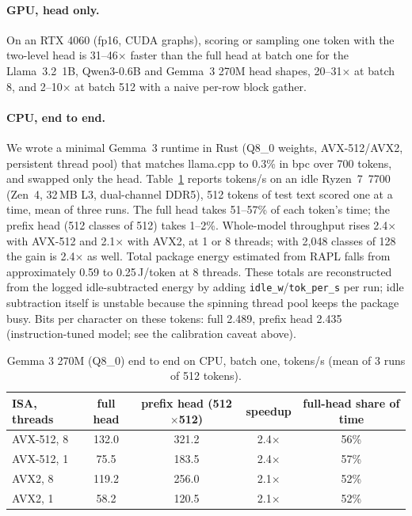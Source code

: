 \documentclass[11pt]{article}
\begin{document}
\paragraph{GPU, head only.} On an RTX 4060 (fp16, CUDA graphs), scoring or sampling one token with the two-level head is 31--46$\times$ faster than the full head at batch one for the Llama~3.2~1B, Qwen3-0.6B and Gemma~3 270M head shapes, 20--31$\times$ at batch 8, and 2--10$\times$ at batch 512 with a naive per-row block gather.

\paragraph{CPU, end to end.} We wrote a minimal Gemma~3 runtime in Rust (Q8\_0 weights, AVX-512/AVX2, persistent thread pool) that matches llama.cpp to 0.3\% in bpc over 700 tokens, and swapped only the head. Table~\ref{tab:cpu} reports tokens/s on an idle Ryzen~7~7700 (Zen~4, 32\,MB L3, dual-channel DDR5), 512 tokens of test text scored one at a time, mean of three runs. The full head takes 51--57\% of each token's time; the prefix head (512 classes of 512) takes 1--2\%. Whole-model throughput rises 2.4$\times$ with AVX-512 and 2.1$\times$ with AVX2, at 1 or 8 threads; with 2{,}048 classes of 128 the gain is 2.4$\times$ as well. Total package energy estimated from RAPL falls from approximately 0.59 to 0.25\,J/token at 8 threads. These totals are reconstructed from the logged idle-subtracted energy by adding \texttt{idle\_w}/\texttt{tok\_per\_s} per run; idle subtraction itself is unstable because the spinning thread pool keeps the package busy. Bits per character on these tokens: full 2.489, prefix head 2.435 (instruction-tuned model; see the calibration caveat above).

\begin{table}[t]
\centering
\caption{Gemma 3 270M (Q8\_0) end to end on CPU, batch one, tokens/s (mean of 3 runs of 512 tokens).}
\label{tab:cpu}
\begin{tabular}{lcccc}
\toprule
ISA, threads & full head & prefix head (512$\times$512) & speedup & full-head share of time \\
\midrule
AVX-512, 8 & 132.0 & 321.2 & 2.4$\times$ & 56\% \\
AVX-512, 1 & 75.5 & 183.5 & 2.4$\times$ & 57\% \\
AVX2, 8 & 119.2 & 256.0 & 2.1$\times$ & 52\% \\
AVX2, 1 & 58.2 & 120.5 & 2.1$\times$ & 52\% \\
\bottomrule
\end{tabular}
\end{table}
\end{document}
